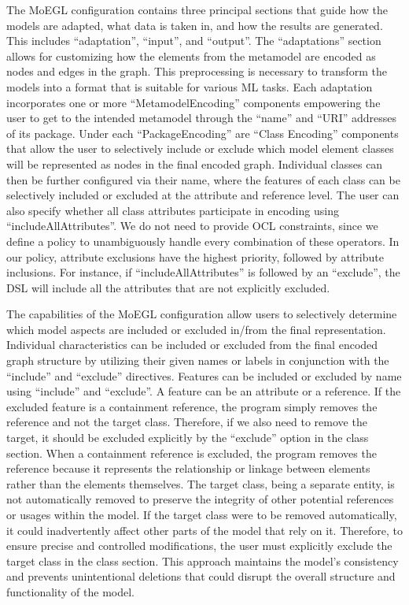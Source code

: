 \documentclass[journal,article,submit,moreauthors,technologies]{Definitions/mdpi}
\begin{document}
The MoEGL configuration contains three principal sections that guide how the models are adapted, what data is taken in, and how the results are generated. This includes ``adaptation'', ``input'', and ``output''. The ``adaptations'' section allows for customizing how the elements from the metamodel are encoded as nodes and edges in the graph. This preprocessing is necessary to transform the models into a format that is suitable for various ML tasks. Each adaptation incorporates one or more ``MetamodelEncoding'' components empowering the user to get to the intended metamodel through the ``name'' and ``URI'' addresses of its package. Under each ``PackageEncoding'' are ``Class Encoding'' components that allow the user to selectively include or exclude which model element classes will be represented as nodes in the final encoded graph. Individual classes can then be further configured via their name, where the features of each class can be selectively included or excluded at the attribute and reference level. The user can also specify whether all class attributes participate in encoding using ``includeAllAttributes''. We do not need to provide OCL constraints, since we define a policy to unambiguously handle every combination of these operators. In our policy, attribute exclusions have the highest priority, followed by attribute inclusions. For instance, if ``includeAllAttributes'' is followed by an ``exclude'', the DSL will include all the attributes that are not explicitly excluded.

The capabilities of the MoEGL configuration allow users to selectively determine which model aspects are included or excluded in/from the final representation. Individual characteristics can be included or excluded from the final encoded graph structure by utilizing their given names or labels in conjunction with the ``include'' and ``exclude'' directives. Features can be included or excluded by name using ``include'' and ``exclude''. A feature can be an attribute or a reference. If the excluded feature is a containment reference, the program simply removes the reference and not the target class. Therefore, if we also need to remove the target, it should be excluded explicitly by the ``exclude'' option in the class section. When a containment reference is excluded, the program removes the reference because it represents the relationship or linkage between elements rather than the elements themselves. The target class, being a separate entity, is not automatically removed to preserve the integrity of other potential references or usages within the model. If the target class were to be removed automatically, it could inadvertently affect other parts of the model that rely on it. Therefore, to ensure precise and controlled modifications, the user must explicitly exclude the target class in the class section. This approach maintains the model's consistency and prevents unintentional deletions that could disrupt the overall structure and functionality of the model.
\end{document}
